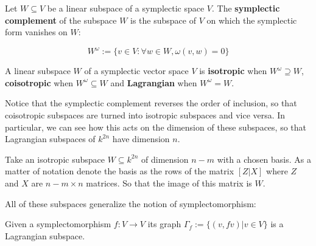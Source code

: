 \begin{definition}
Let $W \subseteq V$ be a linear subspace of a symplectic space $V$.
The {\bf symplectic complement} of the subspace $W$ is the subspace of $V$ on which the symplectic form vanishes on $W$:

$$
W^\omega:= \{v \in V : \forall w \in W, \omega(v,w)=0 \}
$$

A linear subspace  $W$ of a symplectic vector space $V$ is {\bf isotropic} when $W^\omega \supseteq W$, {\bf coisotropic} when $W^\omega \subseteq W$ and {\bf Lagrangian} when $W^\omega=W$.
\end{definition}
Notice that the symplectic complement reverses the order of inclusion, so that coisotropic subspaces are turned into isotropic subspaces and vice versa.  In particular, we can see how this acts on the dimension of these subspaces, so that Lagrangian subspaces of $k^{2n}$ have dimension $n$.


Take an isotropic subspace $W \subseteq k^{2n}$ of dimension $n-m$ with a chosen basis.  As a matter of notation denote the basis as the rows of the matrix $[Z|X]$ where $Z$ and $X$ are  $n-m\times n$ matrices. So that the image of this matrix is $W$.


All of these subspaces generalize the notion of symplectomorphism:
\begin{lemma}
Given a symplectomorphism $f:V\to V$ its graph  $\Gamma_f:=\{ (v, fv) | v \in V \}$ is a Lagrangian subspace.
\end{lemma}


